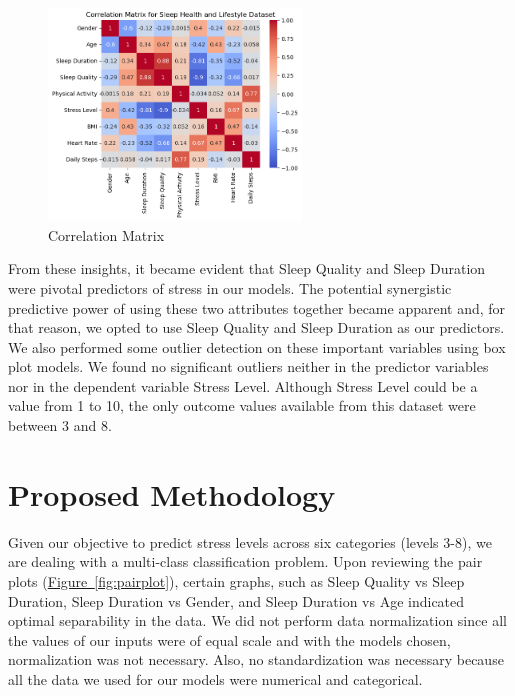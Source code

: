 \documentclass[11pt, letterpaper]{article}
\begin{document}
    \begin{figure}[H]
        \centering
        \includegraphics[width=0.60\textwidth]{correlation.png}
        \caption{Correlation Matrix}
        \label{fig:correlation}
    \end{figure}

    \noindent From these insights, it became evident that Sleep Quality and Sleep Duration were pivotal predictors of stress in our models. The potential synergistic predictive power of using these two attributes together became apparent and, for that reason, we opted to use Sleep Quality and Sleep Duration as our predictors.\\
    
    \noindent We also performed some outlier detection on these important variables using box plot models. We found no significant outliers neither in the predictor variables nor in the dependent variable Stress Level. Although Stress Level could be a value from 1 to 10, the only outcome values available from this dataset were between 3 and 8.\\
    
    \section*{Proposed Methodology}
    \noindent Given our objective to predict stress levels across six categories (levels 3-8), we are dealing with a multi-class classification problem. Upon reviewing the pair plots (\hyperref[fig:pairplot]{Figure~\ref*{fig:pairplot}}), certain graphs, such as Sleep Quality vs Sleep Duration, Sleep Duration vs Gender, and Sleep Duration vs Age indicated optimal separability in the data. We did not perform data normalization since all the values of our inputs were of equal scale and with the models chosen, normalization was not necessary. Also, no standardization was necessary because all the data we used for our models were numerical and categorical. \\
\end{document}
